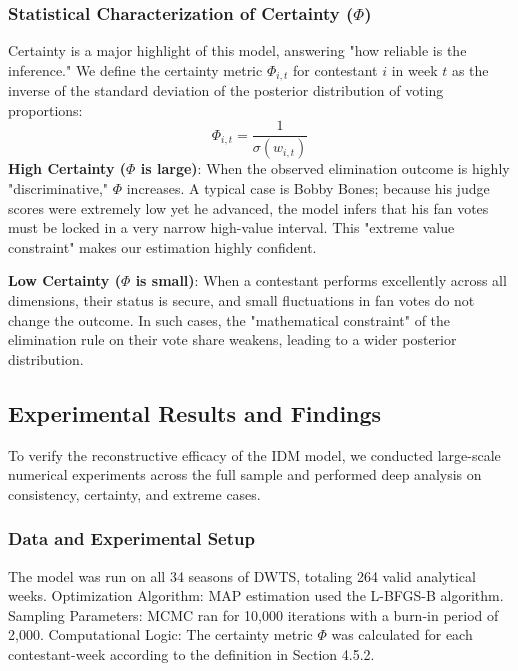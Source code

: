 \documentclass[12pt]{article}
\begin{document}
	\subsubsection{Statistical Characterization of Certainty ($\Phi$)}
	Certainty is a major highlight of this model, answering "how reliable is the inference." We define the certainty metric $\Phi_{i,t}$ for contestant $i$ in week $t$ as the inverse of the standard deviation of the posterior distribution of voting proportions: 
	$$\Phi_{i,t} = \frac{1}{\sigma(w_{i,t})}$$
	\textbf{High Certainty ($\Phi$ is large)}: When the observed elimination outcome is highly "discriminative," $\Phi$ increases. A typical case is Bobby Bones; because his judge scores were extremely low yet he advanced, the model infers that his fan votes must be locked in a very narrow high-value interval. This "extreme value constraint" makes our estimation highly confident.
	
	\textbf{Low Certainty ($\Phi$ is small)}: When a contestant performs excellently across all dimensions, their status is secure, and small fluctuations in fan votes do not change the outcome. In such cases, the "mathematical constraint" of the elimination rule on their vote share weakens, leading to a wider posterior distribution.
	
	\subsection{Experimental Results and Findings}
	To verify the reconstructive efficacy of the IDM model, we conducted large-scale numerical experiments across the full sample and performed deep analysis on consistency, certainty, and extreme cases.
	
	\subsubsection{Data and Experimental Setup}
	The model was run on all 34 seasons of DWTS, totaling 264 valid analytical weeks.
	Optimization Algorithm: MAP estimation used the L-BFGS-B algorithm.
	Sampling Parameters: MCMC ran for 10,000 iterations with a burn-in period of 2,000.
	Computational Logic: The certainty metric $\Phi$ was calculated for each contestant-week according to the definition in Section 4.5.2.
	
\end{document}
